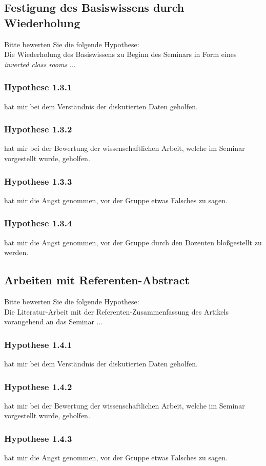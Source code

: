 \subsection*{Festigung des Basiswissens durch Wiederholung}
Bitte bewerten Sie die folgende Hypothese:\\
\noindent
Die Wiederholung des Basiswissens zu Beginn des Seminars in Form eines {\it inverted class rooms} ...
\subsubsection*{Hypothese 1.3.1}
hat mir bei dem Verständnis der diskutierten Daten geholfen.
\subsubsection*{Hypothese 1.3.2}
hat mir bei der Bewertung der wissenschaftlichen Arbeit, welche im Seminar vorgestellt wurde, geholfen.
\subsubsection*{Hypothese 1.3.3}
hat mir die Angst genommen, vor der Gruppe etwas Falsches zu sagen.
\subsubsection*{Hypothese 1.3.4}
hat mir die Angst genommen, vor der Gruppe durch den Dozenten bloßgestellt zu werden.


\subsection*{Arbeiten mit Referenten-Abstract}
Bitte bewerten Sie die folgende Hypothese:\\
\noindent
Die Literatur-Arbeit mit der Referenten-Zusammenfassung des Artikels vorangehend an das Seminar ...
\subsubsection*{Hypothese 1.4.1}
hat mir bei dem Verständnis der diskutierten Daten geholfen.
\subsubsection*{Hypothese 1.4.2}
hat mir bei der Bewertung der wissenschaftlichen Arbeit, welche im Seminar vorgestellt wurde, geholfen.
\subsubsection*{Hypothese 1.4.3}
hat mir die Angst genommen, vor der Gruppe etwas Falsches zu sagen.
